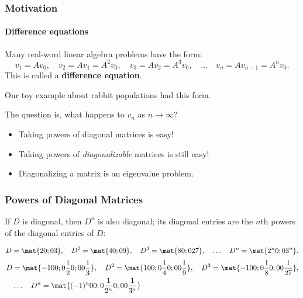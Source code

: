



\begin{frame}
\frametitle{Motivation}
\framesubtitle{Difference equations}

Many real-word linear algebra problems have the form:
\[ v_1 = Av_0, \quad v_2 = Av_1 = A^2 v_0, \quad
v_3 = Av_2 = A^3v_0, \quad \ldots \quad v_n = A v_{n-1} = A^nv_0. \]
This is called a \textbf{difference equation}.

\pause\bigskip
Our toy example about rabbit populations had this form.

\pause\bigskip
The question is, what happens to $v_n$ as $n\to\infty$?

\pause\bigskip
\begin{itemize}
\item Taking powers of diagonal matrices is easy!
  \pause
\item Taking powers of \emph{diagonalizable} matrices is still easy!
  \pause
\item Diagonalizing a matrix is an eigenvalue problem.
\end{itemize}

\end{frame}



\begin{frame}
\frametitle{Powers of Diagonal Matrices}

If $D$ is diagonal, then $D^n$ is also diagonal; its diagonal entries are the
$n$th powers of the diagonal entries of $D$:

\begin{webonly}
\bigskip
\[ \hss D = \mat{2 0 ; 0 3}, \quad
D^2 = \mat{4 0; 0 9}, \quad
D^3 = \mat{8 0; 0 27}, \quad \ldots \quad
D^n = \mat{2^n 0; 0 3^n}. \hss \]
\bigskip
\[\begin{split}
  D &= \mat{-1 0 0; 0 \frac 12 0; 0 0 \frac 13}, \quad
  D^2 = \mat{1 0 0; 0 \frac 14 0; 0 0 \frac 19}, \quad
  D^3 = \mat{-1 0 0; 0 \frac 18 0; 0 0 \frac 1{27}}, \\
  \quad &\ldots\quad D^n = \mat{(-1)^n 0 0; 0 \frac 1{2^n} 0; 0 0 \frac 1{3^n}}
\end{split}\]
\end{webonly}

\end{frame}


